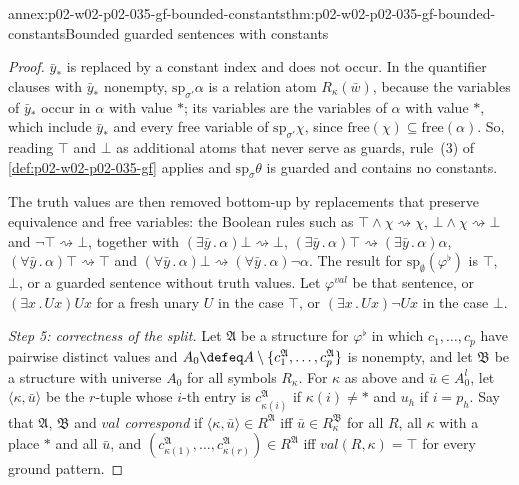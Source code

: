 \begin{annexitem}{annex:p02-w02-p02-035-gf-bounded-constants}{thm:p02-w02-p02-035-gf-bounded-constants}{Bounded guarded sentences with constants}
\begin{proof}
\(\bar y_{\ast}\) is replaced by a constant index and does not occur.  In the
quantifier clauses with \(\bar y_{\ast}\) nonempty, \(\mathrm{sp}_{\sigma'}\alpha\)
is a relation atom \(R_\kappa(\bar w)\), because the variables of
\(\bar y_{\ast}\) occur in \(\alpha\) with value \(\ast\); its variables are the
variables of \(\alpha\) with value \(\ast\), which include \(\bar y_{\ast}\)
and every free variable of \(\mathrm{sp}_{\sigma'}\chi\), since
\(\mathrm{free}(\chi)\subseteq\mathrm{free}(\alpha)\).  So, reading \(\top\)
and \(\bot\) as additional atoms that never serve as guards, rule~(3) of
\cref{def:p02-w02-p02-035-gf} applies and \(\mathrm{sp}_\sigma\theta\) is
guarded and contains no constants.

The truth values are then removed bottom-up by replacements that preserve
equivalence and free variables: the Boolean rules such as
\(\top\land\chi\rightsquigarrow\chi\), \(\bot\land\chi\rightsquigarrow\bot\) and
\(\neg\top\rightsquigarrow\bot\), together with
\((\exists\bar y\,.\,\alpha)\bot\rightsquigarrow\bot\),
\((\exists\bar y\,.\,\alpha)\top\rightsquigarrow(\exists\bar y\,.\,\alpha)\alpha\),
\((\forall\bar y\,.\,\alpha)\top\rightsquigarrow\top\) and
\((\forall\bar y\,.\,\alpha)\bot\rightsquigarrow(\forall\bar y\,.\,\alpha)\neg\alpha\).
The result for \(\mathrm{sp}_\emptyset(\varphi^{\flat})\) is \(\top\), \(\bot\), or a
guarded sentence without truth values.  Let \(\varphi^{\mathit{val}}\) be that
sentence, or \((\exists x\,.\,Ux)Ux\) for a fresh unary \(U\) in the case
\(\top\), or \((\exists x\,.\,Ux)\neg Ux\) in the case \(\bot\).

\emph{Step 5: correctness of the split.}  Let \(\mathfrak A\) be a structure
for \(\varphi^{\flat}\) in which \(c_1,\ldots,c_p\) have pairwise distinct
values and \(A_0\defeq A\setminus\{c_1^{\mathfrak A},\ldots,c_p^{\mathfrak A}\}\)
is nonempty, and let \(\mathfrak B\) be a structure with universe \(A_0\) for
all symbols \(R_\kappa\).  For \(\kappa\) as above and \(\bar u\in A_0^{l}\),
let \(\langle\kappa,\bar u\rangle\) be the \(r\)-tuple whose \(i\)-th entry is
\(c_{\kappa(i)}^{\mathfrak A}\) if \(\kappa(i)\neq\ast\) and \(u_h\) if
\(i=p_h\).  Say that \(\mathfrak A\), \(\mathfrak B\) and \(\mathit{val}\)
\emph{correspond} if \(\langle\kappa,\bar u\rangle\in R^{\mathfrak A}\) iff
\(\bar u\in R_\kappa^{\mathfrak B}\) for all \(R\), all \(\kappa\) with a place
\(\ast\) and all \(\bar u\), and
\((c_{\kappa(1)}^{\mathfrak A},\ldots,c_{\kappa(r)}^{\mathfrak A})\in R^{\mathfrak A}\)
iff \(\mathit{val}(R,\kappa)=\top\) for every ground pattern.


\end{proof}
\end{annexitem}
